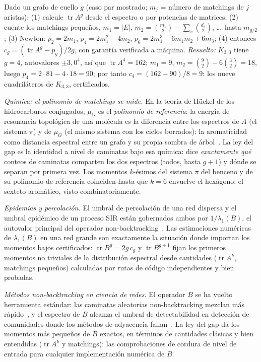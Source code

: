 \documentclass[11pt]{article}
\DeclareMathOperator{\tr}{tr}
\begin{document}
\begin{tcolorbox}[colframe=ggamber,colback=ggamber!8,arc=3pt,boxrule=0.8pt,
  title=\textbf{La receta: cuente los ciclos más cortos de su grafo en cuatro líneas},
  coltitle=white,colbacktitle=ggamber]
Dado un grafo de cuello $g$ (caso par mostrado; $m_j$ = número de matchings de $j$ aristas):
(1) calcule $\tr A^g$ desde el espectro o por potencias de matrices;
(2) cuente los matchings pequeños, $m_1 = |E|$,
$m_2 = \binom{m_1}{2} - \sum_v \binom{d_v}{2}$, \dots\ hasta $m_{g/2}$;
(3) Newton: $p_2 = 2m_1$, $p_4 = 2m_1^2 - 4m_2$, $p_6 = 2m_1^3 - 6m_1m_2 + 6m_3$;
(4) entonces $c_g = (\tr A^g - p_g)/2g$, con garantía verificada a máquina.
\emph{Resuelto:} $K_{3,3}$ tiene $g = 4$, autovalores $\pm 3, 0^4$, así que
$\tr A^4 = 162$; $m_1 = 9$, $m_2 = \binom92 - 6\binom32 = 18$, luego
$p_4 = 2\cdot 81 - 4\cdot 18 = 90$; por tanto $c_4 = (162 - 90)/8 = 9$: los nueve
cuadriláteros de $K_{3,3}$, certificados.
\end{tcolorbox}

\emph{Química: el polinomio de matchings se mide.} En la teoría de H\"uckel de los
hidrocarburos conjugados, $\mu_G$ es el \emph{polinomio de referencia}: la energía de
resonancia topológica de una molécula es la diferencia entre los espectros de $A$ (el
sistema $\pi$) y de $\mu_G$ (el mismo sistema con los ciclos borrados): la aromaticidad como
distancia espectral entre un grafo y su propia sombra de árbol~\cite{Aihara1976,Gutman1979}.
La ley del gap es la identidad a nivel de caminatas bajo esa química: dice \emph{exactamente
qué} conteos de caminatas comparten los dos espectros (todos, hasta $g+1$) y dónde se
separan por primera vez. Los momentos $k$-ésimos del sistema $\pi$ del benceno y de su
polinomio de referencia coinciden hasta que $k = 6$ envuelve el hexágono: el sexteto
aromático, visto combinatoriamente.

\emph{Epidemias y percolación.} El umbral de percolación de una red dispersa y el umbral
epidémico de un proceso SIR están gobernados ambos por $1/\lambda_1(B)$, el autovalor
principal del operador non-backtracking~\cite{KarrerNewman2014}. Las estimaciones numéricas
de $\lambda_1(B)$ en una red grande son exactamente la situación donde importan los momentos
bajos certificados: $\tr B^g = 2g\,c_g$ y $\tr B^{g+1}$ fijan los primeros momentos no
triviales de la distribución espectral desde cantidades ($\tr A^k$, matchings pequeños)
calculadas por rutas de código independientes y bien probadas.

\emph{Métodos non-backtracking en ciencia de redes.} El operador $B$ se ha vuelto
herramienta estándar: las caminatas aleatorias non-backtracking mezclan más
rápido~\cite{ABLS2007}, y el espectro de $B$ alcanza el umbral de detectabilidad en
detección de comunidades donde los métodos de adyacencia fallan~\cite{Krzakala2013}. La ley
del gap da los momentos más pequeños de $B$ exactos, en términos de cantidades clásicas y
bien entendidas ($\tr A^k$ y matchings): las comprobaciones de cordura de nivel de entrada
para cualquier implementación numérica de $B$.
\end{document}
